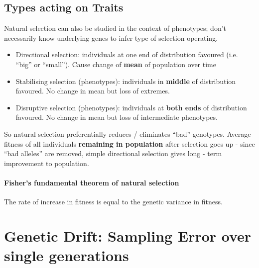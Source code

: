 \documentclass{scrartcl}
\begin{document}
\subsection{Types acting on Traits}
\label{sec:07-03}
Natural selection can also be studied in the context of phenotypes; don't necessarily know underlying genes to infer type of selection operating.
\begin{itemize}
\item Directional selection: individuals at one end of distribution favoured (i.e. ``big'' or ``small''). Cause change of {\bf mean} of population over time
\item Stabilising selection (phenotypes): individuals in {\bf middle} of distribution favoured. No change in mean but loss of extremes.
\item Disruptive selection (phenotypes): individuals at {\bf both ends} of distribution favoured. No change in mean but loss of intermediate phenotypes.
\end{itemize}
So natural selection preferentially reduces / eliminates ``bad'' genotypes. Average fitness of all individuals {\bf remaining in population} after selection goes up - since ``bad alleles'' are removed, simple directional selection gives long - term improvement to population.

\paragraph{Fisher's fundamental theorem of natural selection}
The rate of increase in fitness is equal to the genetic variance in fitness.

\section{Genetic Drift: Sampling Error over single generations}
\label{sec:07-04}
\end{document}
